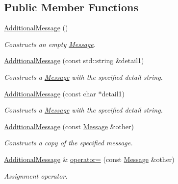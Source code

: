 \subsection*{Public Member Functions}
\begin{DoxyCompactItemize}
\item 
\hypertarget{class_additional_message_a888715179848c5e5c385789b962a3cfb}{\hyperlink{class_additional_message_a888715179848c5e5c385789b962a3cfb}{Additional\-Message} ()}\label{class_additional_message_a888715179848c5e5c385789b962a3cfb}

\begin{DoxyCompactList}\small\item\em Constructs an empty \hyperlink{class_message}{Message}. \end{DoxyCompactList}\item 
\hyperlink{class_additional_message_a990455bbfe260bc04f99e5acc58d1c06}{Additional\-Message} (const std\-::string \&detail1)
\begin{DoxyCompactList}\small\item\em Constructs a \hyperlink{class_message}{Message} with the specified detail string. \end{DoxyCompactList}\item 
\hyperlink{class_additional_message_a6486540f9b5d1957230e9e1f969adc9d}{Additional\-Message} (const char $\ast$detail1)
\begin{DoxyCompactList}\small\item\em Constructs a \hyperlink{class_message}{Message} with the specified detail string. \end{DoxyCompactList}\item 
\hyperlink{class_additional_message_a75735b6fd65686f31349d01c97c73bc7}{Additional\-Message} (const \hyperlink{class_message}{Message} \&other)
\begin{DoxyCompactList}\small\item\em Constructs a copy of the specified message. \end{DoxyCompactList}\item 
\hyperlink{class_additional_message}{Additional\-Message} \& \hyperlink{class_additional_message_abbda0de4323f70ff01a9b622a6f550f7}{operator=} (const \hyperlink{class_message}{Message} \&other)
\begin{DoxyCompactList}\small\item\em Assignment operator. \end{DoxyCompactList}\end{DoxyCompactItemize}


